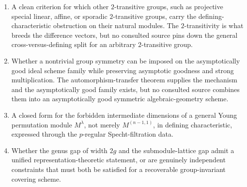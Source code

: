 \documentclass[11pt]{article}
\begin{document}
\begin{enumerate}[leftmargin=1.6em]
\item A clean criterion for which other $2$-transitive groups, such as projective special
  linear, affine, or sporadic $2$-transitive groups, carry the defining-characteristic
  obstruction on their natural modules. The $2$-transitivity is what breeds the difference
  vectors, but no consulted source pins down the general cross-versus-defining split for an
  arbitrary $2$-transitive group.
\item Whether a nontrivial group symmetry can be imposed on the asymptotically good ideal
  scheme family while preserving asymptotic goodness and strong multiplication. The
  automorphism-transfer theorem supplies the mechanism and the asymptotically good family
  exists, but no consulted source combines them into an asymptotically good symmetric
  algebraic-geometry scheme.
\item A closed form for the forbidden intermediate dimensions of a general Young
  permutation module $M^\lambda$, not merely $M^{(n-1,1)}$, in defining characteristic,
  expressed through the $p$-regular Specht-filtration data.
\item Whether the genus gap of width $2g$ and the submodule-lattice gap admit a unified
  representation-theoretic statement, or are genuinely independent constraints that must
  both be satisfied for a recoverable group-invariant covering scheme.
\end{enumerate}



\end{document}
